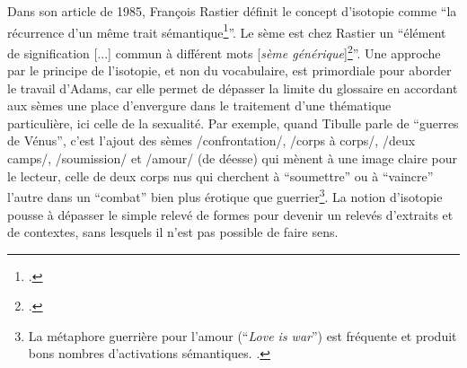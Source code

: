 Dans son article de 1985, François Rastier définit le concept d'isotopie comme \enquote{la récurrence d'un même trait sémantique\footcite{rastier_isotopie_1985}}.
Le sème est chez Rastier un \enquote{élément de signification {[...]} commun à différent mots {[}\textit{sème générique}{]}\footcite{pincemin1999semantique}}. Une approche par le principe de l'isotopie, et non du vocabulaire, est primordiale pour aborder le travail d'Adams, car elle permet de dépasser la limite du glossaire en accordant aux sèmes une place d'envergure dans le traitement d'une thématique particulière, ici celle de la sexualité. Par exemple, quand Tibulle parle de \enquote{guerres de Vénus}, c'est l'ajout des sèmes /confrontation/, /corps à corps/, /deux camps/, /soumission/ et /amour/ (de déesse) qui mènent à une image claire pour le lecteur, celle de deux corps nus qui cherchent à \enquote{soumettre} ou à \enquote{vaincre} l'autre dans un \enquote{combat} bien plus érotique que guerrier\footnote{La métaphore guerrière pour l'amour (\enquote{\textit{Love is war}}) est fréquente et produit bons nombres d'activations sémantiques. \textcite{lakoff_metaphors_2003}.}. La notion d'isotopie pousse à dépasser le simple relevé de formes pour devenir un relevés d'extraits et de contextes, sans lesquels il n'est pas possible de faire sens.

